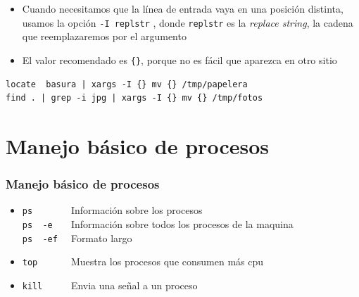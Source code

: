 \documentclass[ucs]{beamer}
\begin{document}
\begin{frame}[fragile]


\begin{itemize}
\item

Cuando necesitamos que la línea de entrada vaya en una posición
distinta, usamos la opción \verb|-I replstr| , donde \verb|replstr| es la 
\emph{replace string},
la cadena que reemplazaremos por el argumento
\item

El valor recomendado es 
\verb|{}|,
porque no es fácil que aparezca en otro sitio
\end{itemize}

  \begin{footnotesize}
  \begin{verbatim}
locate  basura | xargs -I {} mv {} /tmp/papelera
find . | grep -i jpg | xargs -I {} mv {} /tmp/fotos
  \end{verbatim}
  \end{footnotesize}

\end{frame}








\section{Manejo básico de procesos}

\begin{frame}[fragile]
\frametitle{Manejo básico de procesos}
\begin{itemize} 
\item \verb|ps       | Información sobre los procesos \\
\verb|ps  -e   | Información sobre todos los procesos de la maquina\\
\verb|ps  -ef  | Formato largo\\

\item \verb|top      | Muestra los procesos que consumen más cpu
\item \verb|kill     | Envia una señal a un proceso
\end{itemize}
\end{frame}
\end{document}
